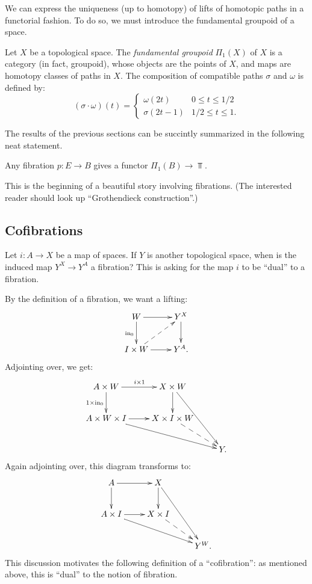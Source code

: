 We can express the uniqueness (up to homotopy) of lifts of homotopic paths in a functorial fashion.
To do so, we must introduce the fundamental groupoid of a space.
\begin{definition}
    Let $X$ be a topological space.
    The \emph{fundamental groupoid} $\Pi_1(X)$ of $X$ is a category (in fact, groupoid),
    whose objects are the points of $X$, and maps are homotopy classes of paths in $X$.
    The composition of compatible paths $\sigma$ and $\omega$ is defined by:
    \begin{equation*}
	(\sigma\cdot\omega)(t) = \begin{cases}
	    \omega(2t) & 0\leq t\leq 1/2\\
	    \sigma(2t - 1) & 1/2\leq t\leq 1.
	\end{cases}
    \end{equation*}
\end{definition}
The results of the previous sections can be succintly summarized in the following neat statement.
\begin{prop}
    Any fibration $p:E\to B$ gives a functor $\Pi_1(B)\to \Top$.
\end{prop}
This is the beginning of a beautiful story involving fibrations.
(The interested reader should look up ``Grothendieck construction''.)

\subsection{Cofibrations}
Let $i:A\to X$ be a map of spaces.
If $Y$ is another topological space, when is the induced map $Y^X\to Y^A$ a fibration?
This is asking for the map $i$ to be ``dual'' to a fibration.

By the definition of a fibration, we want a lifting:
\begin{equation*}
    \xymatrix{
	W\ar[r]\ar[d]_{\mathrm{in}_0} & Y^X\ar[d]\\
	I\times W\ar@{-->}[ur]\ar[r] & Y^A.
    }
\end{equation*}
Adjointing over, we get:
\begin{equation*}
    \xymatrix{
	A\times W\ar[r]^{i\times 1}\ar[d]_{1\times \mathrm{in}_0} & X\times W\ar[d]\ar[ddr]& \\
	A\times W\times I \ar[r]\ar[drr] & X\times I\times W\ar@{-->}[dr] & \\
	& & Y.
    }
\end{equation*}
Again adjointing over, this diagram transforms to:
\begin{equation*}
    \xymatrix{
	A\ar[r]\ar[d] & X\ar[d]\ar[ddr] & \\
	A\times I\ar[r]\ar[drr] & X\times I\ar@{-->}[dr] & \\
	& & Y^W.
    }
\end{equation*}
This discussion motivates the following definition of a ``cofibration'':
as mentioned above, this is ``dual'' to the notion of fibration.

